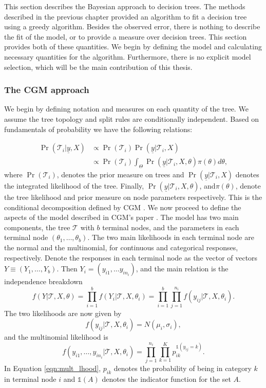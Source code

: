 \documentclass{article}
\newcommand{\yvec}{\underline{y}}
\begin{document}
This section describes the Bayesian approach to decision trees. The methods described in the previous chapter provided an algorithm to fit a decision tree using a greedy algorithm. Besides the observed error, there is nothing to describe the fit of the model, or to  provide a measure over decision trees. This section provides both of these quantities. We begin by defining the model and calculating necessary quantities for the algorithm. Furthermore, there is no explicit model selection, which will be the main contribution of this thesis.    

\subsubsection{The CGM approach}
We begin by defining notation and measures on each quantity of the tree. 
We assume the tree topology and split rules are conditionally independent. Based on fundamentals of probability we have the following relations:

\begin{align}
 \Pr(\mathcal{T}_i \vert \yvec, X ) &\propto \Pr(\mathcal{T}_i)\Pr(\yvec \vert \mathcal{T}_i, X)\\
  &\propto \Pr(\mathcal{T}_i)\int_{\Theta}\Pr(\yvec \vert \mathcal{T}_i, X, \theta)\pi(\theta)d\theta,
\end{align}
where $\Pr(\mathcal{T}_i)$, denotes the prior measure on trees and $\Pr(\yvec \vert \mathcal{T}_i, X)$ denotes the integrated likelihood of the tree. Finally, $\Pr(\yvec \vert \mathcal{T}_i, X, \theta)$, and$\pi(\theta)$, denote the tree likelihood and prior measure on node parameters respectively. This is the conditional decomposition defined by CGM \cite{chipman1998bayesian}. We now proceed to define the aspects of the model described in CGM's paper \cite{chipman1998bayesian}. 
The model has two main components, the tree $\mathcal{T}$ with $b$ terminal nodes, and the parameters in each terminal node $(\theta_1,\dots,\theta_b)$. 
The two main likelihoods in each terminal node are the normal and the multinomial, for continuous and categorical responses, respectively. 
Denote the responses in each terminal node as the vector  of vectors $Y\equiv (Y_1, \dots, Y_b)$. Then $Y_i = (y_{i1}, \dots y_{in_i})$, and the main relation is the independence breakdown 
\begin{equation}\label{eqn:lhood}
f(Y\vert \mathcal{T}, X, \theta) =\prod_{i=1}^b f(Y_i\vert \mathcal{T}, X, \theta_i) = \prod_{i=1}^b \prod_{j=1}^{n_i} f(y_{ij} \vert \mathcal{T}, X, \theta_i).
\end{equation}
The two likelihoods are now given by
\begin{equation}\label{eqn:normal_tree}
f(y_{ij} \vert \mathcal{T}, X, \theta_i) = N(\mu_i,\sigma_i),
\end{equation}
and the multinomial likelihood is
\begin{equation}\label{eqn:mult_lhood}
f(y_{i1}, \dots ,y_{in_i} \vert \mathcal{T}, X, \theta_i) = \prod_{j=1}^{n_i}\prod_{k=1}^K p_{ik}^{\mathds{1}(y_{ij}=k)}.
\end{equation}
In Equation \ref{eqn:mult_lhood}, $p_{ik}$ denotes the probability of being in category $k$ in terminal node $i$ and $\mathds{1}(A)$ denotes the indicator function for the set $A$. 
\end{document}
